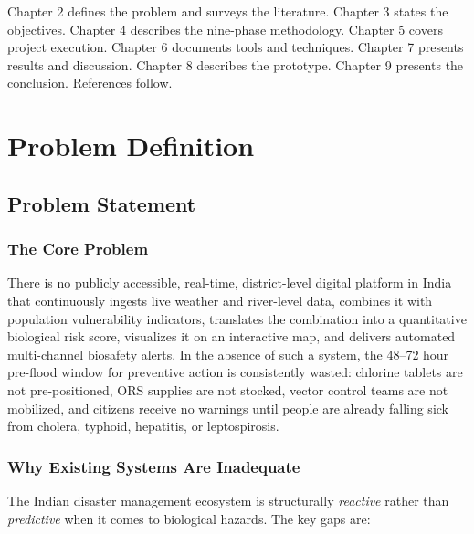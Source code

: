 \documentclass[12pt,a4paper]{report}
\begin{document}
Chapter 2 defines the problem and surveys the literature. Chapter 3 states the objectives. Chapter 4 describes the nine-phase methodology. Chapter 5 covers project execution. Chapter 6 documents tools and techniques. Chapter 7 presents results and discussion. Chapter 8 describes the prototype. Chapter 9 presents the conclusion. References follow.

\chapter{Problem Definition}

\section{Problem Statement}

\subsection{The Core Problem}

There is no publicly accessible, real-time, district-level digital platform in India that continuously ingests live weather and river-level data, combines it with population vulnerability indicators, translates the combination into a quantitative biological risk score, visualizes it on an interactive map, and delivers automated multi-channel biosafety alerts. In the absence of such a system, the 48--72 hour pre-flood window for preventive action is consistently wasted: chlorine tablets are not pre-positioned, ORS supplies are not stocked, vector control teams are not mobilized, and citizens receive no warnings until people are already falling sick from cholera, typhoid, hepatitis, or leptospirosis.

\subsection{Why Existing Systems Are Inadequate}

The Indian disaster management ecosystem is structurally \textit{reactive} rather than \textit{predictive} when it comes to biological hazards. The key gaps are:
\end{document}
